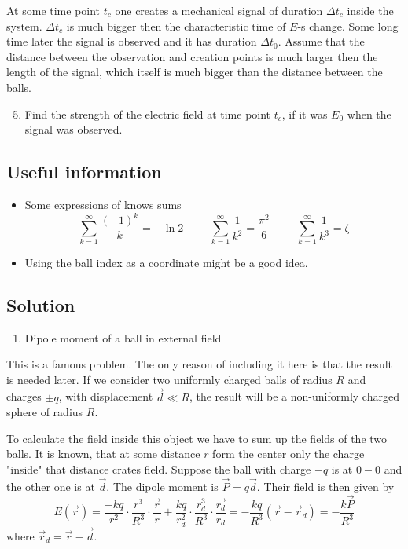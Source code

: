 At some time point $t_c$
one creates a mechanical signal of duration $\Delta t_c$ inside the system.
$\Delta t_c$ is much bigger then the characteristic time of $E$-s change.
Some long time later the signal is observed and it has duration $\Delta t_0$.
Assume that the distance between the observation and creation points
is much larger then the length of the signal,
which itself is much bigger than the distance between the balls.

\begin{enumerate}
    \setcounter{enumi}{4}
    \item Find the strength of the electric field at time point $t_c$,
    if it was $E_0$ when the signal was observed.
\end{enumerate}

\subsection*{Useful information}
\begin{itemize}
\item Some expressions of knows sums
\begin{equation}
    \sum_{k=1}^{\infty} \frac{(-1)^k}{k} = -\ln{2}
    \hspace{1cm}
    \sum_{k=1}^{\infty} \frac{1}{k^2} = \frac{\pi^2}{6}
    \hspace{1cm}
    \sum_{k=1}^{\infty} \frac{1}{k^3} = \zeta
\end{equation}

\item Using the ball index as a coordinate might be a good idea.

\end{itemize}

\subsection*{Solution}

\begin{enumerate}
    \item Dipole moment of a ball in external field
\end{enumerate}

This is a famous problem.
The only reason of including it here is that the result is needed later.
If we consider two uniformly charged balls of radius $R$ and charges $\pm q$,
with displacement $\vec{d} \ll R$,
the result will be a non-uniformly charged sphere of radius $R$.

To calculate the field inside this object
we have to sum up the fields of the two balls.
It is known, that at some distance $r$ form the center
only the charge "inside" that distance crates field.
Suppose the ball with charge $-q$ is at $0-0$
and the other one is at $\vec{d}$.
The dipole moment is $\vec{P} = q \vec{d}$.
Their field is then given by
\begin{equation}
    E(\vec{r}) = \frac{-k q}{r^2} \cdot \frac{r^3}{R^3} \cdot \frac{\vec{r}}{r} +
        \frac{k q}{r_d^2} \cdot \frac{r_d^3}{R^3} \cdot \frac{\vec{r_d}}{r_d} =
        -\frac{kq}{R^3}(\vec{r} - \vec{r}_d) = -\frac{k \vec{P}}{R^3}
\end{equation}
where $\vec{r}_d = \vec{r} - \vec{d}$.

